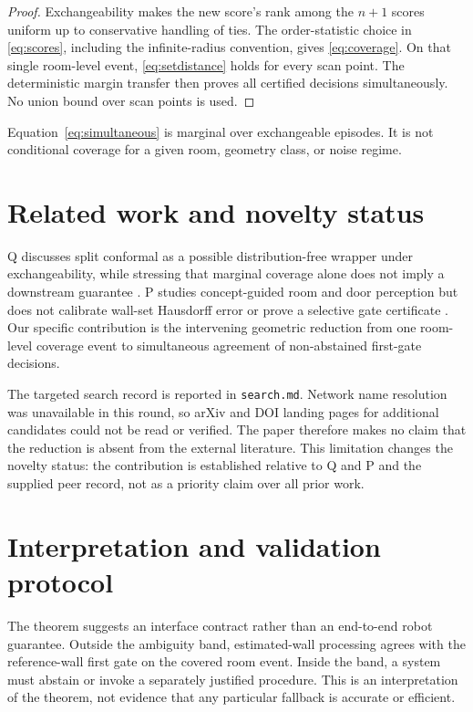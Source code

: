 \documentclass{article}
\begin{document}
\begin{proof}
Exchangeability makes the new score's rank among the $n+1$ scores uniform up to conservative handling of ties. The order-statistic choice in \eqref{eq:scores}, including the infinite-radius convention, gives \eqref{eq:coverage}. On that single room-level event, \eqref{eq:setdistance} holds for every scan point. The deterministic margin transfer then proves all certified decisions simultaneously. No union bound over scan points is used.
\end{proof}

Equation~\eqref{eq:simultaneous} is marginal over exchangeable episodes. It is not conditional coverage for a given room, geometry class, or noise regime. %

\section{Related work and novelty status}

Q discusses split conformal as a possible distribution-free wrapper under exchangeability, while stressing that marginal coverage alone does not imply a downstream guarantee \cite{zhao2026laa}. %
P studies concept-guided room and door perception but does not calibrate wall-set Hausdorff error or prove a selective gate certificate \cite{zapata2026concept}. %
Our specific contribution is the intervening geometric reduction from one room-level coverage event to simultaneous agreement of non-abstained first-gate decisions. %

The targeted search record is reported in \texttt{search.md}. Network name resolution was unavailable in this round, so arXiv and DOI landing pages for additional candidates could not be read or verified. The paper therefore makes no claim that the reduction is absent from the external literature. This limitation changes the novelty status: the contribution is established relative to Q and P and the supplied peer record, not as a priority claim over all prior work.

\section{Interpretation and validation protocol}
\label{sec:interpretation}

The theorem suggests an interface contract rather than an end-to-end robot guarantee. Outside the ambiguity band, estimated-wall processing agrees with the reference-wall first gate on the covered room event. Inside the band, a system must abstain or invoke a separately justified procedure. %
This is an interpretation of the theorem, not evidence that any particular fallback is accurate or efficient. %
\end{document}

